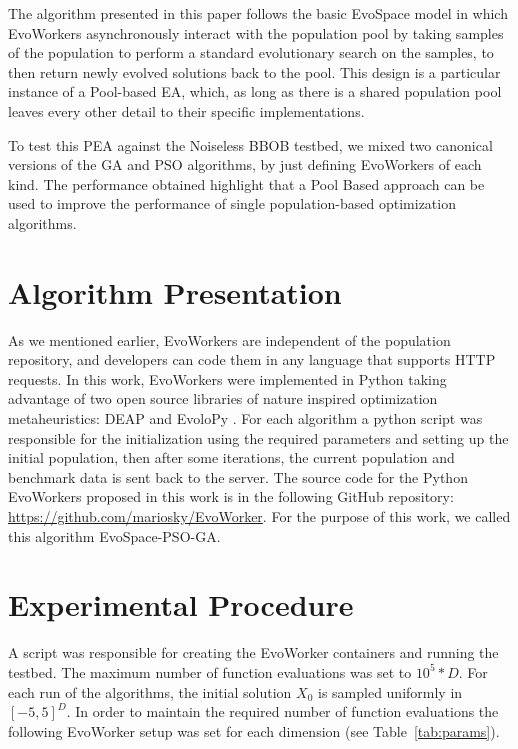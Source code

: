 \documentclass[sigconf]{acmart}
\begin{document}
The algorithm presented in this paper follows the basic  EvoSpace model
\cite{GValdez2015} in which EvoWorkers  asynchronously interact with the
population pool by taking samples of the population to perform a standard
evolutionary search on the samples, to then return newly evolved solutions back
to the pool. This design is a particular instance of a Pool-based EA, which, as
long as there is a shared population pool leaves every other detail to their
specific implementations.


To test this PEA against the Noiseless BBOB testbed, 
we mixed two canonical versions of the GA and PSO algorithms, 
by just defining EvoWorkers of each kind. The performance 
obtained highlight 
that a Pool Based approach can be used to improve the performance 
of single population-based optimization algorithms.

\section{Algorithm Presentation}

As we mentioned earlier, EvoWorkers are independent of 
the population repository, and developers can code them 
in any language that supports HTTP requests. In this work,  
EvoWorkers were implemented in Python taking advantage of 
two open source libraries of nature inspired optimization 
metaheuristics:  DEAP \cite{fortin2012deap} and EvoloPy 
\cite{faris2016evolopy}. For each algorithm a 
python script was responsible for the initialization using 
the required parameters and setting up the initial population, 
then after some iterations, the current population and 
benchmark data is sent back to the server. The source code 
for the Python EvoWorkers proposed in this work is in 
the following GitHub repository: \url{https://github.com/mariosky/EvoWorker}.
For the purpose of this work, we called this algorithm EvoSpace-PSO-GA.   


% 
\section{Experimental Procedure} 
A script was responsible for creating the
EvoWorker  containers and running the testbed. The maximum number of  function
evaluations was set to $10^5*D$. For each run  of the algorithms, the initial
solution $X_0$ is sampled uniformly in $[−5, 5]^D$. In order to maintain the
required number of function  evaluations the following EvoWorker setup was set
for each dimension (see Table~\ref{tab:params}).
\end{document}
